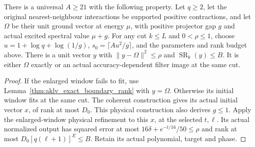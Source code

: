 \begin{lemma}
    \label{thm:aklv_physical_accuracy_window}
    \leanok
    There is a universal $A\ge21$ with the following property.
    Let $q\ge2$, let the original nearest-neighbour interactions be supported
    positive contractions, and let $\Omega$ be their unit ground vector at
    energy $\mu$, with positive projector gap $g$ and actual excited
    spectral value $\mu+g$.
    For any cut $k\le L$ and $0<\rho\le1$, choose
    $u=1+\log q+\log(1/g)$, $s_0=\lceil Au^2/g\rceil$, and the parameters
    and rank budget above. There is a unit vector $y$ with
    $\|y-\Omega\|^2\le\rho$ and $\operatorname{SR}_k(y)\le B$.
    It is either $\Omega$ exactly or an actual accuracy-dependent filter
    image at the same cut.
\end{lemma}
\begin{proof}
    \leanok
    If the enlarged window fails to fit, use
    Lemma~\ref{thm:aklv_exact_boundary_rank} with $y=\Omega$.
    Otherwise its initial window fits at the same cut. The coherent
    construction gives its actual initial vector $x$, of rank at most $D_0$.
    This physical construction also derives $g\le1$.
    Apply the enlarged-window physical refinement to this $x$, at the
    selected $t,\ell$. Its actual normalized output has squared error
    at most $16\delta+e^{-t/16}/50\le\rho$ and rank at most
    $D_0[q(\ell+1)]^E\le B$. Retain its actual polynomial, target and phase.
\end{proof}
